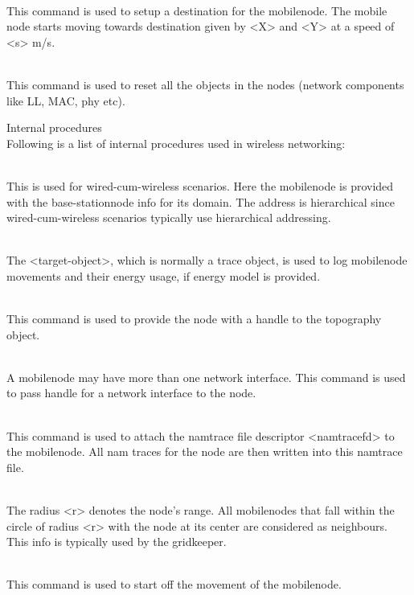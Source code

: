 \begin{flushleft}
\\
This command is used to setup a destination for the mobilenode. The mobile
node starts moving towards destination given by <X> and <Y> at a speed of
<s> m/s.


\\
This command is used to reset all the objects in the nodes (network 
components like LL, MAC, phy etc).


Internal procedures\\
Following is a list of internal procedures used in wireless networking:

\\
This is used for wired-cum-wireless scenarios. Here the mobilenode is provided
with the base-stationnode info for its domain. The address is hierarchical
since wired-cum-wireless scenarios typically use hierarchical addressing.


\\
The <target-object>, which is normally a trace object, is used to log
mobilenode movements and their energy usage, if energy model is provided.


\\
This command is used to provide the node with a handle to the topography
object.


\\
A mobilenode may have more than one network interface. This command is used
to pass handle for a network interface to the node.


\\
This command is used to attach the namtrace file descriptor <namtracefd>
to the mobilenode. All nam traces for the node are then written into this
namtrace file.


\\
The radius <r> denotes the node's range. All mobilenodes that fall within
the circle of radius <r> with the node at its center are considered as
neighbours. This info is typically used by the gridkeeper.


\\
This command is used to start off the movement of the mobilenode.

\end{flushleft}

%
\endinput


